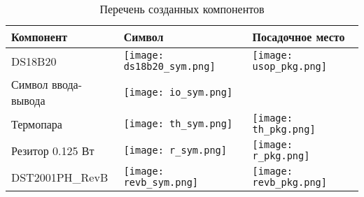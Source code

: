 \begin{longtable}{|p{6cm}|p{6cm}|p{4cm}|}
\caption{Перечень созданных компонентов} \label{table:eagleUserLib} \\
\hline
Компонент & Символ & Посадочное место \\
\hline
DS18B20 & \texttt{[image: ds18b20\_sym.png]} & \texttt{[image: usop\_pkg.png]}  \\
\hline
Символ ввода-вывода & \texttt{[image: io\_sym.png]} & \\
\hline
Термопара & \texttt{[image: th\_sym.png]} & \texttt{[image: th\_pkg.png]} \\
\hline
Резитор 0.125 Вт & \texttt{[image: r\_sym.png]} & \texttt{[image: r\_pkg.png]}  \\
\hline
DST2001PH\_RevB & \texttt{[image: revb\_sym.png]} & \texttt{[image: revb\_pkg.png]} \\
\hline
\end{longtable}
